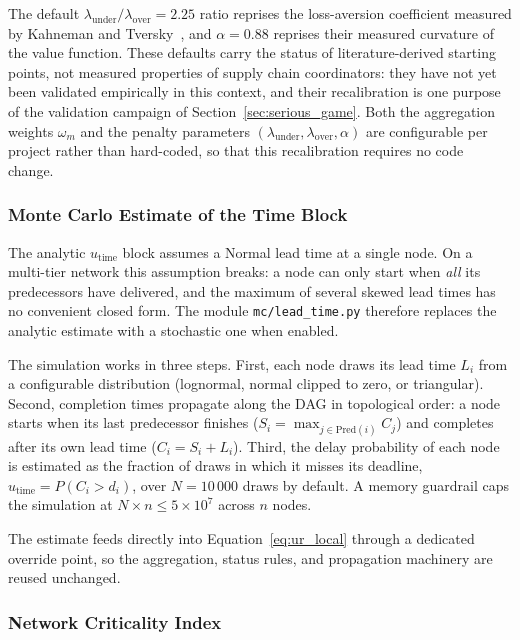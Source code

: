 The default $\lambda_{\text{under}}/\lambda_{\text{over}} = 2.25$ ratio reprises the loss-aversion coefficient measured by Kahneman and Tversky~\autocite{kahneman1979prospect,kahneman2011thinking}, and $\alpha = 0.88$ reprises their measured curvature of the value function. These defaults carry the status of literature-derived starting points, not measured properties of supply chain coordinators: they have not yet been validated empirically in this context, and their recalibration is one purpose of the validation campaign of Section~\ref{sec:serious_game}. Both the aggregation weights $\omega_m$ and the penalty parameters $(\lambda_{\text{under}}, \lambda_{\text{over}}, \alpha)$ are configurable per project rather than hard-coded, so that this recalibration requires no code change.

\subsubsection{Monte Carlo Estimate of the Time Block}
\label{sec:mc_criticality}

The analytic $u_{\text{time}}$ block assumes a Normal lead time at a single node. On a multi-tier network this assumption breaks: a node can only start when \emph{all} its predecessors have delivered, and the maximum of several skewed lead times has no convenient closed form. The module \texttt{mc/lead\_time.py} therefore replaces the analytic estimate with a stochastic one when enabled.

The simulation works in three steps. First, each node draws its lead time $L_i$ from a configurable distribution (lognormal, normal clipped to zero, or triangular). Second, completion times propagate along the DAG in topological order: a node starts when its last predecessor finishes ($S_i = \max_{j\in\text{Pred}(i)} C_j$) and completes after its own lead time ($C_i = S_i + L_i$). Third, the delay probability of each node is estimated as the fraction of draws in which it misses its deadline, $u_{\text{time}} = P(C_i > d_i)$, over $N=10\,000$ draws by default. A memory guardrail caps the simulation at $N \times n \le 5\times 10^7$ across $n$ nodes.

The estimate feeds directly into Equation~\ref{eq:ur_local} through a dedicated override point, so the aggregation, status rules, and propagation machinery are reused unchanged.

\subsubsection{Network Criticality Index}
\label{sec:criticality}

